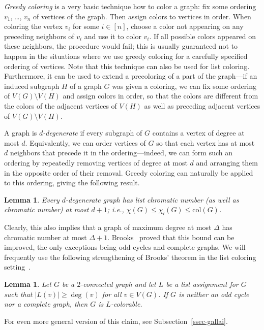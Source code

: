 \documentclass[12pt,twoside,openright,a4paper]{book}
\newtheorem{lemma}[theorem]{Lemma}
\newcommand{\col}{\text{col}}
\begin{document}
\emph{Greedy coloring} is a very basic technique how to color a graph: fix some ordering $v_1$, \ldots, $v_n$ of
vertices of the graph.  Then assign colors to vertices in order. When coloring the vertex $v_i$ for some $i\in[n]$,
choose a color not appearing on any preceding neighbors of $v_i$ and use it to color $v_i$.  If all possible colors
appeared on these neighbors, the procedure would fail; this is usually guaranteed not to happen in the situations where
we use greedy coloring for a carefully specified ordering of vertices.  Note that this technique can also be used for list coloring.
Furthermore, it can be used to extend a precoloring of a part of the graph---if an induced subgraph $H$ of a graph $G$ was given
a coloring, we can fix some ordering of $V(G)\setminus V(H)$ and assign colors in order, so that the colors are different
from the colors of the adjacent vertices of $V(H)$ as well as preceding adjacent vertices of $V(G)\setminus V(H)$.

A graph is \emph{$d$-degenerate} if every subgraph of $G$ contains a vertex of degree at most $d$.
Equivalently, we can order vertices of $G$ so that each vertex has at most $d$ neighbors that precede it in the
ordering---indeed, we can form such an ordering by repeatedly removing vertices of degree at most $d$ and
arranging them in the opposite order of their removal.
Greedy coloring can naturally be applied to this ordering, giving the following result.
\begin{lemma}\label{lemma:degen}
Every $d$-degenerate graph has list chromatic number (as well as chromatic number) at most $d+1$; i.e., $\chi(G)\le\chi_l(G)\le \col(G)$.
\end{lemma}

Clearly, this also implies that a graph of maximum degree at most $\Delta$ has chromatic number
at most $\Delta+1$.  Brooks~\cite{brooks1941colouring} proved that this bound can be improved, the only exceptions
being odd cycles and complete graphs.  We will frequently use the following strengthening of Brooks' theorem
in the list coloring setting~\cite{galfor}.
\begin{lemma}\label{lemma:gallai1}
Let $G$ be a $2$-connected graph and let $L$ be a list assignment for $G$ such that $|L(v)|\ge \deg(v)$ for all $v\in V(G)$.
If $G$ is neither an odd cycle nor a complete graph, then $G$ is $L$-colorable.
\end{lemma}
For even more general version of this claim, see Subsection~\ref{ssec-gallai}.
\end{document}
